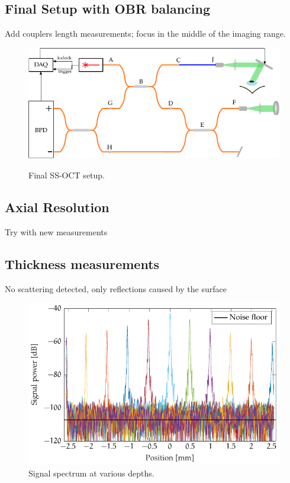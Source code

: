\subsection{Final Setup with OBR balancing}
Add couplers length measurements;  focus in the middle of the imaging range. 
\begin{figure}[bth]
	\myfloatalign
	{\includegraphics[width=\linewidth]{gfx/setup-diagrams/final-setup.pdf}}
	\caption{Final SS-OCT setup.}\label{fig:final-setup}
\end{figure}

\subsection{Axial Resolution}
Try with new measurements

\subsection{Thickness measurements}
No scattering detected, only reflections caused by the surface


\begin{figure}[hbt]
\myfloatalign
\includegraphics[width=\linewidth]{gfx/falloff}
\caption{Signal spectrum at various depths.}\label{fig:power-falloff}
\end{figure}


